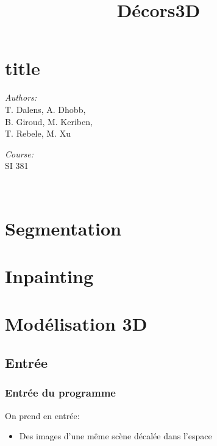\documentclass[compress]{beamer} %
\begin{document}
 \title{Décors3D} 
 \section{title}
 \begin{frame}
\titlepage
    \centering
    \begin{minipage}{0.4\textwidth}
    \begin{flushleft} \large
    \emph{Authors:}\\
    T. Dalens, A. Dhobb,\\
    B. Giroud, M. Keriben,\\
    T. Rebele, M. Xu\\
    \end{flushleft}
    \end{minipage}
    \begin{minipage}{0.4\textwidth}
    \begin{flushright} \large
    \emph{Course:}\\
    SI 381
    \end{flushright}
    \end{minipage}\\[3cm]
 \end{frame}
 \section{Segmentation}
 \section{Inpainting}
 \section{Modélisation 3D}
 \subsection{Entrée}
	  
	  \begin{frame}
	  \frametitle{Entrée du programme}
	  On prend en entrée:
	  \begin{itemize}
	    
	    [triangle]
	    \item Des images d’une même scène décalée dans l’espace
	    \end{itemize}

	    
	  \end{frame}
	  
\end{document}

